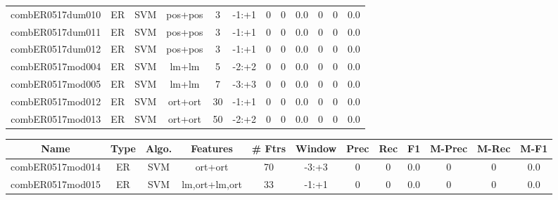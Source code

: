 \documentclass[a4paper]{article}
\begin{document}
\begin{landscape}
\begin{center}
\begin{tabular}{ |c|c|c|c|c|c|c|c|c|c|c|c|}
 
 	
 	\small{ combER0517dum010 } & ER & SVM & pos+pos  &  3 &  -1:+1  &  0 & 0 & 0.0  &  0 & 0 & 0.0 \\
 	

 
 	
 	\small{ combER0517dum011 } & ER & SVM & pos+pos  &  3 &  -1:+1  &  0 & 0 & 0.0  &  0 & 0 & 0.0 \\
 	

 
 	
 	\small{ combER0517dum012 } & ER & SVM & pos+pos  &  3 &  -1:+1  &  0 & 0 & 0.0  &  0 & 0 & 0.0 \\
 	

 
 	
 	\small{ combER0517mod004 } & ER & SVM & lm+lm  &  5 &  -2:+2  &  0 & 0 & 0.0  &  0 & 0 & 0.0 \\
 	

 
 	
 	\small{ combER0517mod005 } & ER & SVM & lm+lm  &  7 &  -3:+3  &  0 & 0 & 0.0  &  0 & 0 & 0.0 \\
 	

 
 	
 	\small{ combER0517mod012 } & ER & SVM & ort+ort  &  30 &  -1:+1  &  0 & 0 & 0.0  &  0 & 0 & 0.0 \\
 	

 
 	
 	\small{ combER0517mod013 } & ER & SVM & ort+ort  &  50 &  -2:+2  &  0 & 0 & 0.0  &  0 & 0 & 0.0 \\
 	
 \hline
\end{tabular}
\end{center}




\begin{center}
\begin{tabular}{ |c|c|c|c|c|c|c|c|c|c|c|c|} 
 \hline
 	Name & Type & Algo. & Features & \# Ftrs & Window & Prec & Rec & F1 & M-Prec & M-Rec & M-F1\\
 \hline

 	

 
 	
 	\small{ combER0517mod014 } & ER & SVM & ort+ort  &  70 &  -3:+3  &  0 & 0 & 0.0  &  0 & 0 & 0.0 \\
 	

 
 	
 	\small{ combER0517mod015 } & ER & SVM & lm,ort+lm,ort  &  33 &  -1:+1  &  0 & 0 & 0.0  &  0 & 0 & 0.0 \\
 	


\end{tabular}
\end{center}
\end{landscape}
\end{document}
